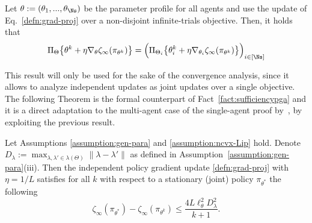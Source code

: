\begin{lemma}\label{claim:projection} 
    Let $\theta := (\theta_1,...,\theta_\Ns)$ be the parameter profile for all agents and use the update of Eq.~\eqref{defn:grad-proj} over a non-disjoint infinite-trials objective. Then, it holds that
    \begin{equation*}
        \Pi_{\Theta}\big\{\theta^k + \eta\nabla_\theta \zeta_\infty(\pi_{\theta^k})\big\} = \Big( \Pi_{\Theta_i}\big\{\theta^k_i + \eta\nabla_{\theta_i} \zeta_\infty(\pi_{\theta^k})\big\}\Big)_{i \in [\Ns]}
    \end{equation*}
\end{lemma}

This result will only be used for the sake of the convergence analysis, since it allows to analyze independent updates as joint updates over a single objective. The following Theorem is the formal counterpart of Fact~\ref{fact:sufficiencypga} and it is a direct adaptation to the multi-agent case of the single-agent proof by~\citet{zhang2020variationalpolicygradientmethod}, by exploiting the previous result.


\begin{theorem}
	\label{theorem:iteration complexity-gen}
	Let Assumptions \ref{assumption:gen-para} and \ref{assumption:ncvx-Lip} hold. Denote $D_\lambda \!:=\! \max_{\lambda,\lambda'\in\lambda(\Theta)} \|\lambda-\lambda'\|$ as defined in Assumption~\ref{assumption:gen-para}(iii). Then the independent policy gradient update \eqref{defn:grad-proj} with $\eta = 1/L$ satisfies for all $k$ with respect to a stationary (joint) policy $\pi_{\theta^*}$ the following\vspace{-2mm}
	\begin{equation*}
	\zeta_\infty(\pi_{\theta^*}) \!-\! \zeta_\infty(\pi_{\theta^k})\leq \frac{4L\ell_{\theta}^2D_\lambda^2}{k+1}.
	\end{equation*}
\end{theorem} 


